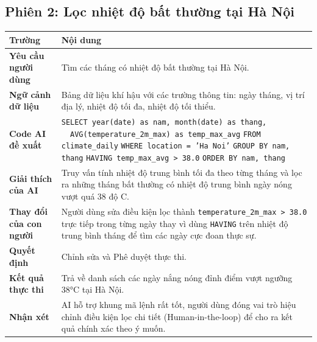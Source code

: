 \subsection*{Phiên 2: Lọc nhiệt độ bất thường tại Hà Nội}
\begin{table}[htbp]
\centering
\renewcommand{\arraystretch}{1.25}
\begin{tabularx}{\textwidth}{|>{\bfseries}p{}|X|}
\hline
\textbf{Trường} & \textbf{Nội dung} \\ \hline
Yêu cầu người dùng
    & Tìm các tháng có nhiệt độ bất thường tại Hà Nội. \\ \hline
Ngữ cảnh dữ liệu
    & Bảng dữ liệu khí hậu với các trường thông tin: ngày tháng, vị trí địa lý, nhiệt độ tối đa, nhiệt độ tối thiểu. \\ \hline
Code AI đề xuất
    & \texttt{SELECT year(date) as nam, month(date) as thang,} \newline
      \texttt{~~AVG(temperature\_2m\_max) as temp\_max\_avg} \newline
      \texttt{FROM climate\_daily} \newline
      \texttt{WHERE location = 'Ha Noi'} \newline
      \texttt{GROUP BY nam, thang} \newline
      \texttt{HAVING temp\_max\_avg > 38.0} \newline
      \texttt{ORDER BY nam, thang} \\ \hline
Giải thích của AI
    & Truy vấn tính nhiệt độ trung bình tối đa theo từng tháng và lọc ra những tháng bất thường có nhiệt độ trung bình ngày nóng vượt quá 38 độ C. \\ \hline
Thay đổi của con người
    & Người dùng sửa điều kiện lọc thành \texttt{temperature\_2m\_max > 38.0} trực tiếp trong từng ngày thay vì dùng \texttt{HAVING} trên nhiệt độ trung bình tháng để tìm các ngày cực đoan thực sự. \\ \hline
Quyết định
    & Chỉnh sửa và Phê duyệt thực thi. \\ \hline
Kết quả thực thi & Trả về danh sách các ngày nắng nóng đỉnh điểm vượt ngưỡng 38°C tại Hà Nội. \\ \hline
Nhận xét & AI hỗ trợ khung mã lệnh rất tốt, người dùng đóng vai trò hiệu chỉnh điều kiện lọc chi tiết (Human-in-the-loop) để cho ra kết quả chính xác theo ý muốn. \\ \hline
\end{tabularx}
\end{table}
